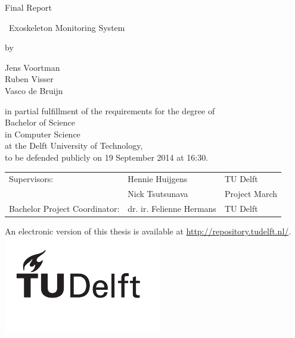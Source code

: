 \begin{titlepage}
\begin{center}


{\makeatletter
\Huge Final Report
\makeatother}

{\makeatletter
\LARGE\ Exoskeleton Monitoring System
\makeatother}

\bigskip
\bigskip

by

\bigskip
\bigskip

{\makeatletter
Jens Voortman\\
Ruben Visser\\
Vasco de Bruijn
\makeatother}

\vfill

in partial fulfillment of the requirements for the degree of\\
\bigskip
Bachelor of Science\\
in Computer Science\\
\bigskip
at the Delft University of Technology,\\
to be defended publicly on 19 September 2014 at 16:30.

\vfill

\begin{tabular}{l l l}
    Supervisors: & Hennie Huijgens & TU Delft \\
    & Nick Tsutsunava & Project March \\
    Bachelor Project Coordinator: & dr. ir. Felienne Hermans & TU Delft\\
 \end{tabular}

\bigskip
\bigskip

\bigskip
\bigskip
An electronic version of this thesis is available at \url{http://repository.tudelft.nl/}.\\
\includegraphics{logo/logo_black}
\end{center}
\end{titlepage}